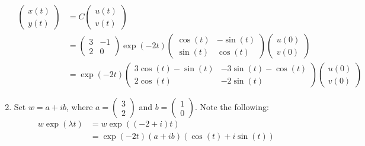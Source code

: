 \documentclass[12pt,letterpaper]{article}
\begin{document}
\begin{enumerate}[label=(\alph*)]
	      \begin{align}
		      \begin{pmatrix}
			      x(t) \\
			      y(t)
		      \end{pmatrix} & = C \begin{pmatrix}
			      u(t) \\
			      v(t)
		      \end{pmatrix}                                                    \\
		                                 & = \begin{pmatrix}
			      3 & -1 \\
			      2 & 0
		      \end{pmatrix}
		      \exp(-2 t)\begin{pmatrix}
			      \cos(t) & -\sin(t) \\
			      \sin(t) & \cos(t)
		      \end{pmatrix}  \begin{pmatrix}
			      u(0) \\
			      v(0)
		      \end{pmatrix}\\
		                                 & = \exp(-2 t) \begin{pmatrix}
			      3\cos(t) - \sin(t) & -3\sin(t) - \cos(t) \\
			      2\cos(t)           & -2\sin(t)
		      \end{pmatrix}\begin{pmatrix}
			      u(0) \\
			      v(0)
		      \end{pmatrix}\label{eq:sol_1}
	      \end{align}
	\item Set $w = a + i b$, where $a = \begin{pmatrix}
			      3 \\
			      2
		      \end{pmatrix}$ and $b = \begin{pmatrix}
			      1 \\
			      0
		      \end{pmatrix}$. Note the following:
	      \begin{align}
		      w\exp(\lambda t) & = w \exp((-2 + i)t)                                        \\
		                       & =\exp(-2t) (a + ib)(\cos(t) + i\sin(t))                    \\

\end{align}
\end{enumerate}
\end{document}
